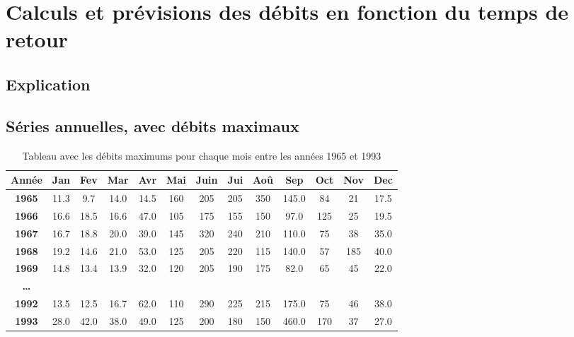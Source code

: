 \chapter{Calculs et prévisions des débits en fonction du temps de retour}

\section{Explication}

\section{Séries annuelles, avec débits maximaux}

\begin{table}[H]
    \centering
    \begin{tabular}{|c||c|c|c|c|c|c|c|c|c|c|c|c|}
        \hline
        \textbf{Année} & \textbf{Jan} & \textbf{Fev} & \textbf{Mar} & \textbf{Avr} & \textbf{Mai} & \textbf{Juin} & \textbf{Jui} & \textbf{Aoû} & \textbf{Sep} & \textbf{Oct} & \textbf{Nov} & \textbf{Dec} \\
        \hline \hline
        \textbf{1965}  & 11.3 &  9.7 & 14.0 & 14.5 & 160 & 205 & 205 & \cellcolor{red}350 & 145.0 &  84 &  21 & 17.5 \\
        \hline
        \textbf{1966}  & 16.6 & 18.5 & 16.6 & 47.0 & 105 & \cellcolor{red}175 & 155 & 150 &  97.0 & 125 &  25 & 19.5 \\
        \hline
        \textbf{1967}  & 16.7 & 18.8 & 20.0 & 39.0 & 145 & \cellcolor{red}320 & 240 & 210 & 110.0 &  75 &  38 & 35.0 \\
        \hline
        \textbf{1968}  & 19.2 & 14.6 & 21.0 & 53.0 & 125 & 205 & \cellcolor{red}220 & 115 & 140.0 &  57 & 185 & 40.0 \\
        \hline
        \textbf{1969}  & 14.8 & 13.4 & 13.9 & 32.0 & 120 & \cellcolor{red}205 & 190 & 175 &  82.0 &  65 &  45 & 22.0 \\
        \hline
        \textbf{\dots} &      &      &      &      &     &     &     &     &       &     &     &      \\
        \hline
        \textbf{1992}  & 13.5 & 12.5 & 16.7 & 62.0 & 110 & \cellcolor{red}290 & 225 & 215 & 175.0 &  75 &  46 & 38.0 \\
        \hline
        \textbf{1993}  & 28.0 & 42.0 & 38.0 & 49.0 & 125 & 200 & 180 & 150 & \cellcolor{red}460.0 & 170 &  37 & 27.0 \\
        \hline
    \end{tabular}
    \caption{Tableau avec les débits maximums pour chaque mois entre les années 1965 et 1993}
    \label{tab:serieAnnuelleMaximum}
\end{table}

